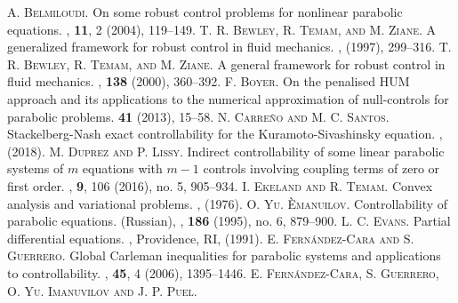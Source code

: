 \documentclass[preprint,10pt]{article}
\numberwithin{equation}{section}
\numberwithin{theorem}{section}
\begin{document}
{\begin{thebibliography}{7}
%
\textsc{A. Belmiloudi.}
\newblock On some robust control problems for nonlinear parabolic equations.
, \textbf{11}, 2 (2004), 119--149.
%
\textsc{T. R. Bewley, R. Temam, and M. Ziane.}
\newblock A generalized framework for robust control in fluid mechanics. 
, (1997), 299--316.
%
\textsc{T. R. Bewley, R. Temam, and M. Ziane.}
\newblock A general framework for robust control in fluid mechanics.
, \textbf{138} (2000), 360--392.
%
\textsc{F. Boyer.}
\newblock On the penalised HUM approach and its applications to the numerical approximation of null-controls for parabolic problems.
 \textbf{41} (2013), 15--58.
%
\textsc{N. Carre\~{n}o and M. C. Santos}.
\newblock Stackelberg-Nash exact controllability for the Kuramoto-Sivashinsky equation.
, (2018). 
%
\textsc{M. Duprez and P. Lissy.}
\newblock Indirect controllability of some linear parabolic systems of $m$ equations with $m-1$ controls involving coupling terms of zero or first order. 
, \textbf{9}, 106 (2016), no. 5, 905--934.
%
\textsc{I. Ekeland and R. Temam.}
\newblock Convex analysis and variational problems.
, (1976).
%
\textsc{O. Yu. \`{E}manuilov.} 
\newblock Controllability of parabolic equations. (Russian),
, \textbf{186} (1995), no. 6, 879--900.
%
\textsc{L. C. Evans.}
\newblock Partial differential equations. 
, Providence, RI, (1991). 
%
%
%
\textsc{E. Fern\'andez-Cara and S. Guerrero.}
\newblock Global {C}arleman inequalities for parabolic systems and applications to controllability.
, \textbf{45}, 4 (2006), 1395--1446.
%
\textsc{E. Fern\'andez-Cara, S. Guerrero, O. Yu. Imanuvilov and  J. P.  Puel.}  

\end{thebibliography}}
\end{document}
